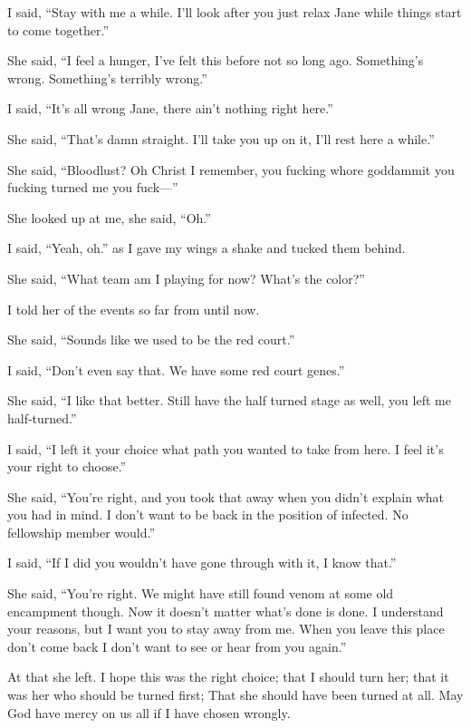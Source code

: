 I said, ``Stay with me a while. I'll look after you just relax Jane while things start to come together.''

She said, ``I feel a hunger, I've felt this before not so long ago. Something's wrong. Something's terribly wrong.''

I said, ``It's all wrong Jane, there ain't nothing right here.''

She said, ``That's damn straight. I'll take you up on it, I'll rest here a while.''

\parasep

She said, ``Bloodlust? Oh Christ I remember, you fucking whore goddammit you fucking turned me you fuck---''

She looked up at me, she said, ``Oh.''

I said, ``Yeah, oh.'' as I gave my wings a shake and tucked them behind.

She said, ``What team am I playing for now? What's the color?''

I told her of the events so far from \chichenitza* until now.

She said, ``Sounds like we used to be the red court.''

I said, ``Don't even say that. We have some red court genes.''

She said, ``I like that better. Still have the half turned stage as well, you left me half-turned.''

I said, ``I left it your choice what path you wanted to take from here. I feel it's your right to choose.''

She said, ``You're right, and you took that away when you didn't explain what you had in mind. I don't want to be back in the position of infected. No fellowship member would.''

I said, ``If I did you wouldn't have gone through with it, I know that.''

She said, ``You're right. We might have still found venom at some old encampment though. Now it doesn't matter what's done is done. I understand your reasons, but I want you to stay away from me. When you leave this place don't come back I don't want to see or hear from you again.''

At that she left. I hope this was the right choice; that I should turn her; that it was her who should be turned first; That she should have been turned at all. May God have mercy on us all if I have chosen wrongly.

